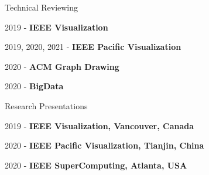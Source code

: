 

Technical Reviewing

\begin{cvparagraph}
    2019 - \textbf{IEEE Visualization}

    2019, 2020, 2021 - \textbf{IEEE Pacific Visualization}

    2020 - \textbf{ACM Graph Drawing}

    2020 - \textbf{BigData}
\end{cvparagraph}

Research Presentations

\begin{cvparagraph}
    
    2019 - \textbf{IEEE Visualization, Vancouver, Canada}
    
    2020 - \textbf{IEEE Pacific Visualization, Tianjin, China}

    2020 - \textbf{IEEE SuperComputing, Atlanta, USA}
\end{cvparagraph}
